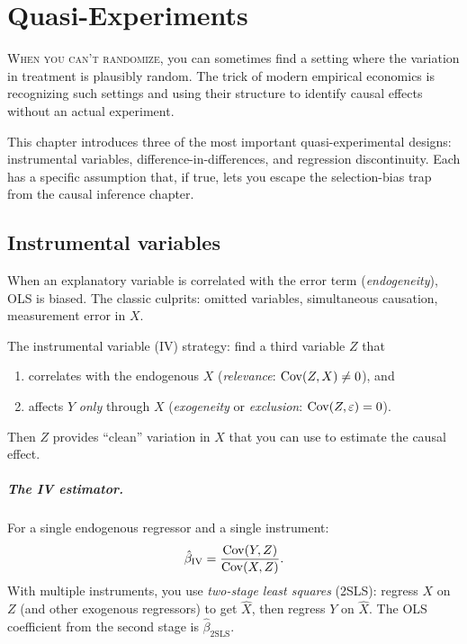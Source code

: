 \chapter{Quasi-Experiments}
\label{ch:iv-did}

\noindent\textsc{When you can't randomize,} you can sometimes find a setting where the variation in treatment is plausibly random. The trick of modern empirical economics is recognizing such settings and using their structure to identify causal effects without an actual experiment.

This chapter introduces three of the most important quasi-experimental designs: instrumental variables, difference-in-differences, and regression discontinuity. Each has a specific assumption that, if true, lets you escape the selection-bias trap from the causal inference chapter.

\section{Instrumental variables}

When an explanatory variable is correlated with the error term (\emph{endogeneity}), OLS is biased. The classic culprits: omitted variables, simultaneous causation, measurement error in $X$.

The instrumental variable (IV) strategy: find a third variable $Z$ that
\begin{enumerate}[noitemsep]
\item correlates with the endogenous $X$ (\emph{relevance}: $\operatorname{Cov}(Z, X) \neq 0$), and
\item affects $Y$ \emph{only} through $X$ (\emph{exogeneity} or \emph{exclusion}: $\operatorname{Cov}(Z, \varepsilon) = 0$).
\end{enumerate}
Then $Z$ provides ``clean'' variation in $X$ that you can use to estimate the causal effect.

\paragraph{The IV estimator.} For a single endogenous regressor and a single instrument:
\begin{equation}
  \hat\beta_{\text{IV}} = \frac{\operatorname{Cov}(Y, Z)}{\operatorname{Cov}(X, Z)}.
  \label{eq:iv-estimator}
\end{equation}
With multiple instruments, you use \emph{two-stage least squares} (2SLS): regress $X$ on $Z$ (and other exogenous regressors) to get $\hat X$, then regress $Y$ on $\hat X$. The OLS coefficient from the second stage is $\hat\beta_{\text{2SLS}}$.


